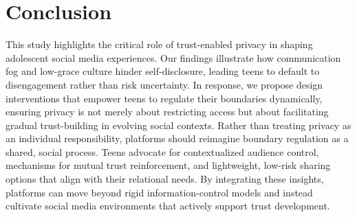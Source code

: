 \section{Conclusion}
This study highlights the critical role of trust-enabled privacy in shaping adolescent social media experiences. Our findings illustrate how communication fog and low-grace culture hinder self-disclosure, leading teens to default to disengagement rather than risk uncertainty. In response, we propose design interventions that empower teens to regulate their boundaries dynamically, ensuring privacy is not merely about restricting access but about facilitating gradual trust-building in evolving social contexts. Rather than treating privacy as an individual responsibility, platforms should reimagine boundary regulation as a shared, social process. Teens advocate for contextualized audience control, mechanisms for mutual trust reinforcement, and lightweight, low-risk sharing options that align with their relational needs. By integrating these insights, platforms can move beyond rigid information-control models and instead cultivate social media environments that actively support trust development.